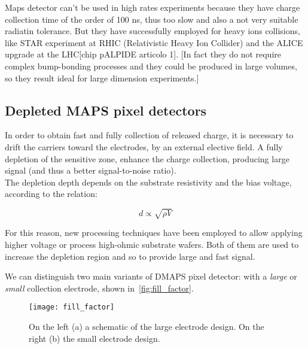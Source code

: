 Maps detector can't be used in high rates experiments because they have charge collection time of the order of 100 ns, thus too slow and also a not very suitable radiatin tolerance.  But they have successfully employed for heavy ions collisions, like STAR experiment at RHIC (Relativistic Heavy Ion Collider) and the ALICE upgrade at the LHC[chip pALPIDE articolo 1]. [In fact they do not require complex bump-bonding processes and they could be produced in large volumes, so they result ideal for large dimension experiments.]


\subsection{Depleted MAPS pixel detectors}

In order to obtain fast and fully collection of released charge, it is necessary to drift the carriers toward the electrodes, by an external elective field. A fully depletion of the sensitive zone, enhance the charge collection, producing large signal (and thus a better signal-to-noise ratio). \\
The depletion depth depends on the substrate resistivity and the bias voltage, according to the relation:

\begin{equation}
d \propto \sqrt{\rho V}
\end{equation}

For this reason, new processing techniques have been employed to allow applying higher voltage or process high-ohmic substrate wafers. Both of them are used to increase the depletion region and so to provide large and fast signal.

We can distinguish two main variants of DMAPS pixel detector: with a \textit{large} or \textit{small} collection electrode, shown in~\autoref{fig:fill_factor}.

\begin{figure}[h!]
\centering
\texttt{[image: fill\_factor]}
\caption{On the left (a) a schematic of the large electrode design. On the right (b) the small electrode design.}
\label{fig:fill_factor}
\end{figure}

